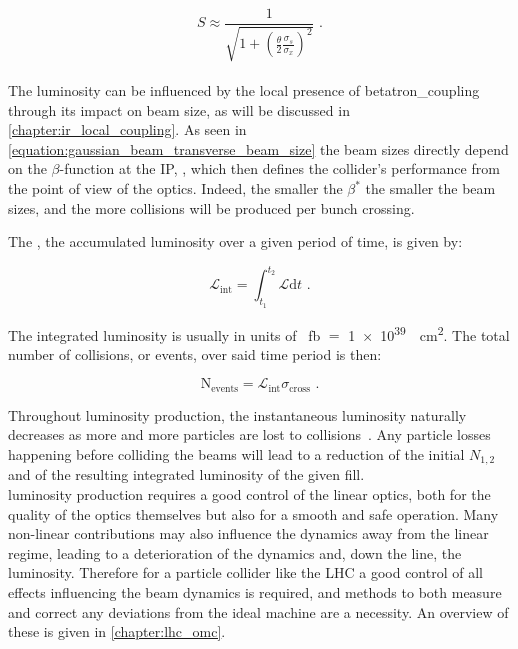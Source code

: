 \begin{equation}
    S \approx \frac{1}{\sqrt{1 + \left( \frac{\theta}{2} \frac{\sigma_s}{\sigma_x} \right)^2}} \text{ .}
    \label{equation:luminosity_reduction_factor}
\end{equation}
\\
The luminosity can be influenced by the local presence of \gls{betatron_coupling} through its impact on beam size, as will be discussed in \cref{chapter:ir_local_coupling}.
As seen in \cref{equation:gaussian_beam_transverse_beam_size} the beam sizes directly depend on the \(\beta\)-function at the \gls{IP}, , which then defines the collider's performance from the point of view of the optics.
Indeed, the smaller the \(\beta^{\ast}\) the smaller the beam sizes, and the more collisions will be produced per bunch crossing.

The , the accumulated luminosity over a given period of time, is given by:

\begin{equation}
    \mathcal{L}_{\mathrm{int}} = \int_{t_1}^{t_2} \mathcal{L} \mathrm{d}t \text{ .}
    \label{equation:integrated_luminosity}
\end{equation}

The integrated luminosity is usually in units of \unit{\per\femto\barn} \(=\) \qty{1e39}{\per\square\centi\meter}.
The total number of collisions, or events, over said time period is then:

\begin{equation}
    \mathrm{N_{events}} = \mathcal{L}_{\mathrm{int}} \sigma_{\mathrm{cross}} \text{ .}
    \label{equation:total_number_collisions}
\end{equation}

Throughout luminosity production, the instantaneous luminosity naturally decreases as more and more particles are lost to collisions~\cite{PRES:Hostettler:LHC_Lumi_Lifetime}.
Any particle losses happening before colliding the beams will lead to a reduction of the initial \(N_{1,2}\) and of the resulting integrated luminosity of the given fill.\\

\Gls{luminosity} production requires a good control of the linear optics, both for the quality of the optics themselves but also for a smooth and safe operation.
Many non-linear contributions may also influence the dynamics away from the linear regime, leading to a deterioration of the dynamics and, down the line, the luminosity.
Therefore for a particle collider like the \gls{LHC} a good control of all effects influencing the beam dynamics is required, and methods to both measure and correct any deviations from the ideal machine are a necessity.
An overview of these is given in \cref{chapter:lhc_omc}.

\glsresetall                                     %
